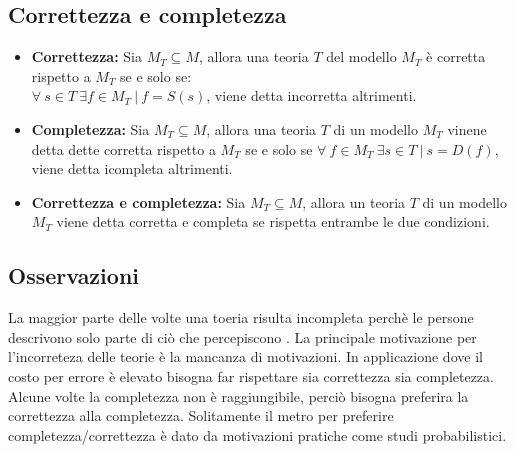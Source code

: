 \documentclass{book}
\newcommand{\spazio}{\vspace{1em} \newline}
\begin{document}
    \subsection{Correttezza e completezza}
    \begin{itemize}
        \item \textbf{Correttezza:} Sia $M_T \subseteq M$, allora una teoria $T$ del modello $M_T$ è corretta rispetto a $M_T$ se e solo se:\\
            $\forall\ s \in T\ \exists f \in M_T\ |\ f=S(s)$, viene detta incorretta altrimenti.
        \item \textbf{Completezza:} Sia $M_T \subseteq M$, allora una teoria $T$ di un modello $M_T$ vinene detta dette corretta rispetto a $M_T$ se e solo se $\forall\ f \in M_T\ \exists s \in T\ |\ s=D(f)$, viene detta icompleta altrimenti.
        \item \textbf{Correttezza e completezza:} Sia $M_T \subseteq M$, allora un teoria $T$ di un modello $M_T$ viene detta corretta e completa se rispetta entrambe le due condizioni.
    \end{itemize}

    \subsection{Osservazioni}
    La maggior parte delle volte una toeria risulta incompleta perchè le persone descrivono solo parte di ciò che percepiscono .
    \spazio
    La principale motivazione per l'incorreteza delle teorie è la mancanza di motivazioni.
    \spazio
    In applicazione dove il costo per errore è elevato bisogna far rispettare sia correttezza sia completezza.
    \space
    Alcune volte la completezza non è raggiungibile, perciò bisogna preferira la correttezza alla completezza.
    \space
    Solitamente il metro per preferire completezza/correttezza è dato da motivazioni pratiche come studi probabilistici.
\end{document}
